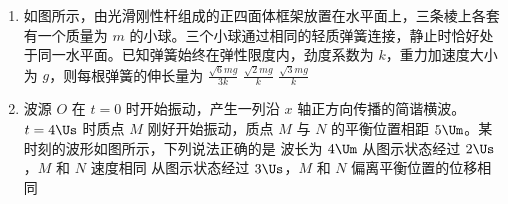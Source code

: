 \documentclass[\gkver]{gaokaozhenti}
\begin{document}
\begin{enumerate}
{图乙中金属棒转动 $\pi$ 为一个周期，则有 $T_{\text{乙}} = \frac{\pi}{2\omega}$

则有 $T_{\text{乙}} = \frac{1}{4}T_{\text{甲}}$

根据题意可知，甲、乙图中产生的交流电均为矩形交流电且正负最大电动势相等，则有

\[ E_{\text{甲}m} = B_{0}L \cdot \frac{0 + \omega L}{2} = \frac{1}{2}B_{0}\omega L^{2} \]

\[ E_{\text{乙}m} = 4B_{0}L \cdot \frac{0 + 2\omega L}{2} = 4B_{0}\omega L^{2} \]

作出图像，如图所示


可知甲、乙图中产生的交流电的有效值为 $E_{\text{甲}} = E_{\text{甲}m} = \frac{1}{2}B_{0}\omega L^{2}$，$E_{\text{乙}} = E_{\text{乙}m} = 4B_{0}\omega L^{2}$

则有 $E_{\text{乙}} = 8E_{\text{甲}}$

故选 D。
}

\item
如图所示，由光滑刚性杆组成的正四面体框架放置在水平面上，三条棱上各套有一个质量为 $m$ 的小球。三个小球通过相同的轻质弹簧连接，静止时恰好处于同一水平面。已知弹簧始终在弹性限度内，劲度系数为 $k$，重力加速度大小为 $g$，则每根弹簧的伸长量为 
{$\frac{\sqrt{6}mg}{3k}$}
{$\frac{\sqrt{2}mg}{k}$}
{$\frac{\sqrt{3}mg}{k}$}

\item
波源 $O$ 在 $t = 0$ 时开始振动，产生一列沿 $x$ 轴正方向传播的简谐横波。$t = 4\Us$ 时质点 $M$ 刚好开始振动，质点 $M$ 与 $N$ 的平衡位置相距 $5\Um$。某时刻的波形如图所示，下列说法正确的是 
\onepicture[w=6cm]{}
{波长为 $4\Um$}
{从图示状态经过 $2\Us$，$M$ 和 $N$ 速度相同}
{从图示状态经过 $3\Us$，$M$ 和 $N$ 偏离平衡位置的位移相同}
\end{enumerate}
\end{document}
